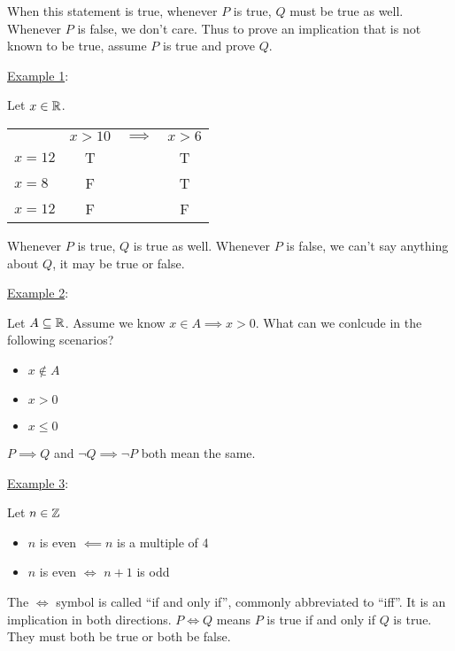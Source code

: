 When this statement is true, whenever \(P\) is true, \(Q\) must be true as well. Whenever \(P\) is false, we don't care. Thus to prove an implication that is not known to be true, assume \(P\) is true and prove \(Q\).

\underline{Example 1}:

Let \(x \in \mathbb{R}\).

\begin{tabular}{l c c c }
              & \(x > 10\)        & \(\implies\)  & \(x > 6\) \\
  \(x = 12\)  & {\color{green}T}  &               & {\color{green}T}  \\
  \(x = 8\)   & {\color{red}F}    &               & {\color{green}T}  \\
  \(x = 12\)  & {\color{red}F}    &               & {\color{red}F}    \\
\end{tabular}

Whenever \(P\) is true, \(Q\) is true as well. Whenever \(P\) is false, we can't say anything about \(Q\), it may be true or false.

\underline{Example 2}:

Let \(A \subseteq \mathbb{R}\). Assume we know \(x \in A \implies x > 0\). What can we conlcude in the following scenarios?

\begin{itemize}
  \item \(x \notin A\) 
  \item \(x > 0\) 
  \item \(x \leq 0\) 
\end{itemize}

\(P \implies Q\) and \(\neg Q \implies \neg P\) both mean the same.

\underline{Example 3}:

Let \(n \in \mathbb{Z}\)
\begin{itemize}
  \item \(n\) is even \(\impliedby n\) is a multiple of 4
  \item \(n\) is even \(\iff\) \(n + 1\) is odd
\end{itemize}

The \(\iff\) symbol is called ``if and only if'', commonly abbreviated to ``iff''. It is an implication in both directions. \(P \iff Q \) means \(P\) is true if and only if \(Q\) is true. They must both be true or both be false.

